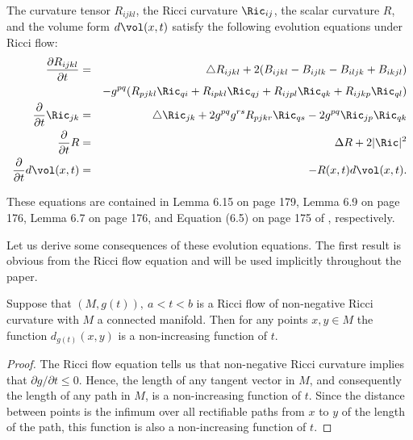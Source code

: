 \smallskip

\begin{theorem}\label{thm:curvature-evolution}
\label{thmRmevol}
The curvature tensor $R_{ijkl}$, the Ricci curvature $\Ric_{ij}$, the scalar
curvature $R$, and the volume form $d\vol(x,t)$ satisfy the following evolution
equations under Ricci flow:
\begin{eqnarray}
\frac{\partial R_{ijkl}}{\partial t} &= & \triangle R_{ijkl} +2(B_{ijkl} -
B_{ijlk}-B_{iljk} + B_{ikjl})\nonumber \\&  &  - g^{pq}(R_{pjkl}\Ric_{qi} +
R_{ipkl}\Ric_{qj} + R_{ijpl}\Ric_{qk} +
R_{ijkp}\Ric_{ql}) \label{Rmevol} \\
\label{Ricevol} \frac{\partial}{\partial t}\Ric_{jk} & = & \triangle
\Ric_{jk}+2g^{pq}g^{rs}R_{pjkr}\Ric_{qs}-2g^{pq}\Ric_{jp}\Ric_{qk} \\
\label{Revol}\frac{\partial}{\partial t}R & = & \Delta R+2|\Ric|^2 \\
\label{dvolevol} \frac{\partial}{\partial t}d\vol(x,t) & = &
-R(x,t)d\vol(x,t).
\end{eqnarray}
\end{theorem}

These equations are contained in Lemma 6.15  on page 179, Lemma 6.9
 on page 176,  Lemma 6.7 on page 176, and Equation (6.5) on
page 175 of \cite{ChowKnopf}, respectively.


Let us derive some consequences of these evolution equations.
The first result is obvious from the Ricci flow equation and will be used implicitly throughout
the paper.

\begin{lemma}\label{lem:distance-nonincreasing}
\label{posdistdec}
Suppose that $(M,g(t)),\ a<t<b$ is a Ricci flow of non-negative Ricci curvature
with $M$ a connected manifold.
Then for any points $x,y\in M$ the function $d_{g(t)}(x,y)$ is a non-increasing function of $t$.
\end{lemma}


\begin{proof}
The Ricci flow equation tells us that non-negative Ricci curvature implies that
$\partial g/\partial t\le 0$. Hence, the length of any tangent vector in $M$, and consequently the length
of any path in $M$, is a non-increasing function of $t$. Since the distance between points is the infimum
over all rectifiable paths from $x$ to $y$ of the length of the path, this function is also a non-increasing function
of $t$.
\end{proof}



